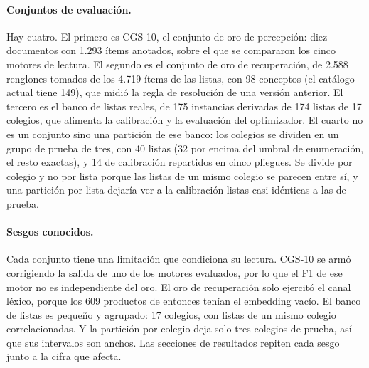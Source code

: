 \paragraph{Conjuntos de evaluación.} Hay cuatro. El primero es CGS-10, el conjunto de oro de
percepción: diez documentos con 1.293 ítems anotados, sobre el que se compararon los cinco motores de
lectura. El segundo es el conjunto de oro de recuperación, de 2.588 renglones tomados de los 4.719
ítems de las listas, con 98 conceptos (el catálogo actual tiene 149), que midió la regla de resolución de una versión anterior. El
tercero es el banco de listas reales, de 175 instancias derivadas de 174 listas de 17 colegios, que
alimenta la calibración y la evaluación del optimizador. El cuarto no es un conjunto sino una
partición de ese banco: los colegios se dividen en un grupo de prueba de tres, con 40 listas (32 por encima del umbral de enumeración, el resto exactas), y 14 de calibración repartidos en cinco pliegues. Se divide por
colegio y no por lista porque las listas de un mismo colegio se parecen entre sí, y una partición por
lista dejaría ver a la calibración listas casi idénticas a las de prueba.

\paragraph{Sesgos conocidos.} Cada conjunto tiene una limitación que condiciona su lectura.
CGS-10 se armó corrigiendo la salida de uno de los motores evaluados, por lo que el F1 de ese motor no
es independiente del oro. El oro de recuperación solo ejercitó el canal léxico, porque los 609
productos de entonces tenían el embedding vacío. El banco de listas es pequeño y agrupado: 17 colegios,
con listas de un mismo colegio correlacionadas. Y la partición por colegio deja solo tres colegios de
prueba, así que sus intervalos son anchos. Las secciones de resultados repiten cada sesgo junto a la
cifra que afecta.
